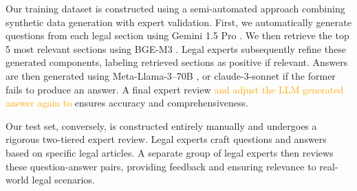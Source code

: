 
Our training dataset is constructed using a semi-automated approach combining synthetic data generation with expert validation. First, we automatically generate questions from each legal section using Gemini 1.5 Pro \cite{gemini1.5}. We then retrieve the top 5 most relevant sections using BGE-M3 \cite{bge-m3}. Legal experts subsequently refine these generated components, labeling retrieved sections as positive if relevant. Answers are then generated using Meta-Llama-3–70B \cite{llama3.1}, or claude-3-sonnet \cite{claude3} if the former fails to produce an answer. A final expert review \textcolor{orange}{and adjust the LLM generated answer again to} ensures accuracy and comprehensiveness.


Our test set, conversely, is constructed entirely manually and undergoes a rigorous two-tiered expert review. Legal experts craft questions and answers based on specific legal articles. A separate group of legal experts then reviews these question-answer pairs, providing feedback and ensuring relevance to real-world legal scenarios.




